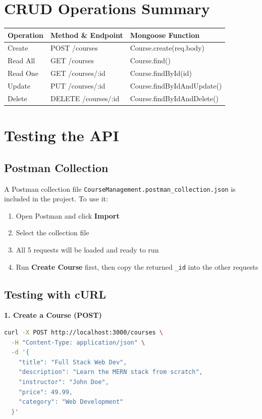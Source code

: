 \documentclass[12pt,a4paper]{article}
\begin{document}
\section{CRUD Operations Summary}

\begin{center}
\begin{tabular}{|l|l|l|}
\hline
\textbf{Operation} & \textbf{Method \& Endpoint} & \textbf{Mongoose Function} \\
\hline
Create  & POST   /courses      & Course.create(req.body) \\
Read All & GET   /courses      & Course.find() \\
Read One & GET   /courses/:id  & Course.findById(id) \\
Update  & PUT    /courses/:id  & Course.findByIdAndUpdate() \\
Delete  & DELETE /courses/:id  & Course.findByIdAndDelete() \\
\hline
\end{tabular}
\end{center}

\section{Testing the API}

\subsection{Postman Collection}
A Postman collection file \texttt{CourseManagement.postman\_collection.json} is included in the project. To use it:
\begin{enumerate}
  \item Open Postman and click \textbf{Import}
  \item Select the collection file
  \item All 5 requests will be loaded and ready to run
  \item Run \textbf{Create Course} first, then copy the returned \texttt{\_id} into the other requests
\end{enumerate}

\subsection{Testing with cURL}

\textbf{1. Create a Course (POST)}
\begin{lstlisting}[language=bash]
curl -X POST http://localhost:3000/courses \
  -H "Content-Type: application/json" \
  -d '{
    "title": "Full Stack Web Dev",
    "description": "Learn the MERN stack from scratch",
    "instructor": "John Doe",
    "price": 49.99,
    "category": "Web Development"
  }'
\end{lstlisting}
\end{document}

